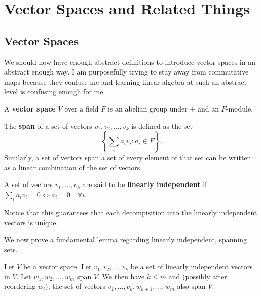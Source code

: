 \section{Vector Spaces and Related Things}
\subsection{Vector Spaces}
We should now have enough abstract definitions to introduce vector
spaces in an abstract enough way. I am purposefully trying to stay away
from commutative maps because they confuse me and learning linear
algebra at such an abstract level is confusing enough for me.

\begin{df}
A \textbf{vector space} $V$ over a field $F$ is an abelian group under
$+$ and an $F$-module.
\end{df}

\begin{df}
The \textbf{span} of a set of vectors $v_1, v_2, \dots, v_k$ is defined
as the set
\[ \left\lbrace \sum_i a_i v_i : a_i \in F \right\rbrace. \]
Similarly, a set of vectors span a set of every element of that set can
be written as a linear combination of the set of vectors.
\end{df}

\begin{df}
A set of vectors $v_1, \dots, v_k$ are said to be \textbf{linearly
independent} if $\sum_i a_i v_i = 0 \Leftrightarrow a_i = 0 \quad
\forall i$.
\end{df}

\begin{rem}
Notice that this guarantees that each decompisition into the linearly
independent vectors is unique.
\end{rem}

We now prove a fundamental lemma regarding linearly independent,
spanning sets.
\begin{lem}
Let $V$ be a vector space. Let $v_1, v_2, \dots, v_k$ be a set of
linearly independent vectors in $V$. Let $w_1, w_2, \dots, w_m$ span
$V$. We then have $k \leq m$ and (possibly after reordering $w_i$), the
set of vectors $v_1, \dots, v_k, w_{k + 1}, \dots, w_m$ also span $V$.
\end{lem}

